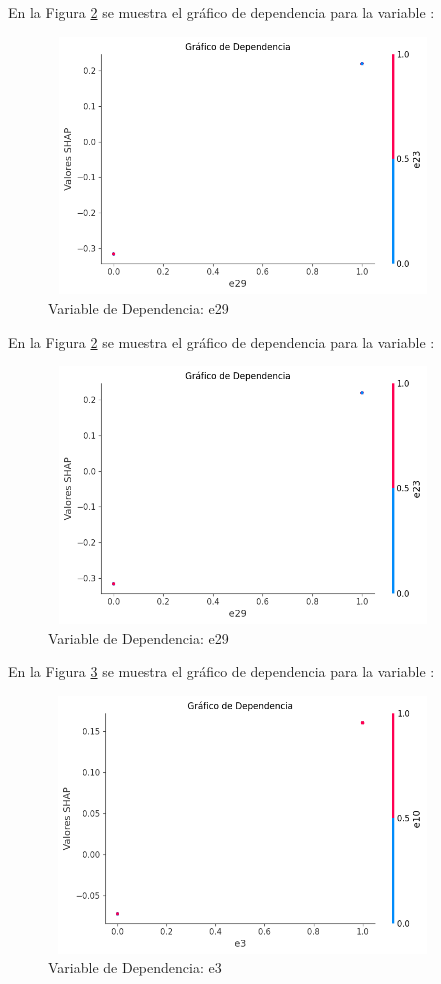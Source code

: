 En la Figura \ref{fig:dependencia_e29_lr} se muestra el gráfico de dependencia para la variable :

\begin{figure}[H]
    \centering
    \includegraphics[width=4.0611in,height=2.6861in]{img/shap_lr/e29.png}
    \caption{Variable de Dependencia: e29}
    \label{fig:dependencia_e29_lr}
\end{figure}

En la Figura \ref{fig:dependencia_e29_lr} se muestra el gráfico de dependencia para la variable :

\begin{figure}[H]
    \centering
    \includegraphics[width=4.0611in,height=2.6861in]{img/shap_lr/e29.png}
    \caption{Variable de Dependencia: e29}
    \label{fig:dependencia_e29_lr}
\end{figure}

En la Figura \ref{fig:dependencia_e3_lr} se muestra el gráfico de dependencia para la variable :

\begin{figure}[H]
    \centering
    \includegraphics[width=4.0611in,height=2.6861in]{img/shap_lr/e3.png}
    \caption{Variable de Dependencia: e3}
    \label{fig:dependencia_e3_lr}
\end{figure}

